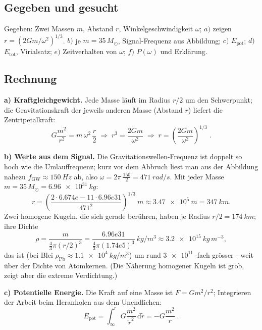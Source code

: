 
\subsection*{Gegeben und gesucht}
Gegeben: Zwei Massen $m$, Abstand $r$, Winkelgeschwindigkeit $\omega$;
$a)$ zeigen $r=(2Gm/\omega^2)^{1/3}$. $b)$ je $m=35\,M_\odot$, Signal-Frequenz
aus Abbildung; $c)$ $E_\mathrm{pot}$; $d)$ $E_\mathrm{tot}$, Virialsatz;
$e)$ Zeitverhalten von $\omega$; $f)$ $P(\omega)$ und Erklärung.

\subsection*{Rechnung}
\textbf{a) Kraftgleichgewicht.} Jede Masse läuft im Radius $r/2$ um den
Schwerpunkt; die Gravitationskraft der jeweils anderen Masse (Abstand $r$)
liefert die Zentripetalkraft:
\begin{equation}
  G\frac{m^2}{r^2} = m\,\omega^2\,\frac r2
  \;\Rightarrow\;
  r^3 = \frac{2Gm}{\omega^2}
  \;\Rightarrow\;
  r = \left(\frac{2Gm}{\omega^2}\right)^{1/3}\;.
\end{equation}

\textbf{b) Werte aus dem Signal.} Die Gravitationswellen-Frequenz ist doppelt
so hoch wie die Umlauffrequenz; kurz vor dem Abbruch liest man aus der
Abbildung nahezu $f_\mathrm{GW}\approx\qty{150}{Hz}$ ab, also
$\omega = 2\pi\,\frac{150}{2} = \qty{471}{rad/s}$. Mit jeder Masse
$m=35\,M_\odot=\qty{6.96e31}{kg}$:
\begin{equation}
  r = \left(\frac{2\cdot 6.674e-11\cdot 6.96e31}{471^2}\right)^{1/3}\ \si{m}
  \approx \qty{3.47e5}{m} = \qty{347}{km}.
\end{equation}
Zwei homogene Kugeln, die sich gerade berühren, haben je Radius $r/2=\qty{174}{km}$;
ihre Dichte
\begin{equation}
  \rho = \frac{m}{\frac43\pi (r/2)^3}
  = \frac{6.96e31}{\frac43\pi (1.74e5)^3}\ \si{kg/m^3}
  \approx \qty{3.2e15}{kg\,m^{-3}},
\end{equation}
das ist (bei Blei $\rho_\mathrm{Pb}\approx\qty{1.1e4}{kg/m^3}$) um rund
$\qty{3e11}{}$-fach grösser - weit über der Dichte von Atomkernen. (Die
Näherung homogener Kugeln ist grob, zeigt aber die extreme Verdichtung.)

\textbf{c) Potentielle Energie.} Die Kraft auf eine Masse ist $F=Gm^2/r^2$;
Integrieren der Arbeit beim Heranholen aus dem Unendlichen:
\begin{equation}
  E_\mathrm{pot} = \int_\infty^r G\frac{m^2}{\tilde r^2}\,\mathrm d\tilde r
  = -G\frac{m^2}{r}\;.
\end{equation}

